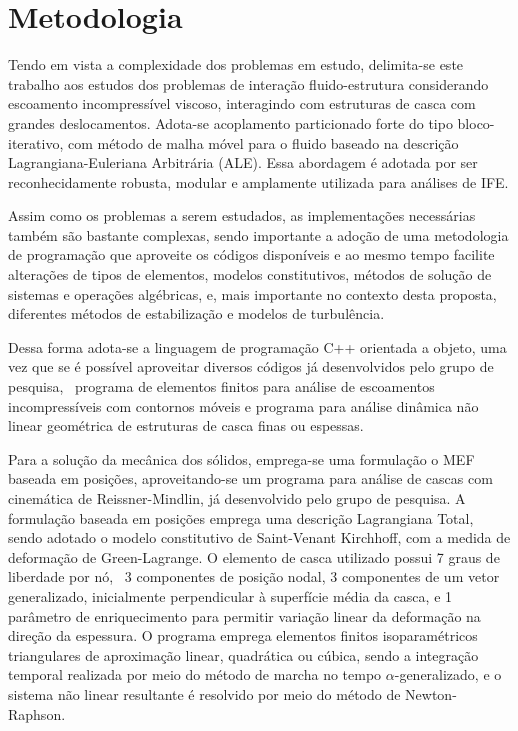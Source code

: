 \section{Metodologia} \label{MetodologiaCronograma}

Tendo em vista a complexidade dos problemas em estudo, delimita-se este trabalho aos estudos dos problemas de interação fluido-estrutura considerando escoamento incompressível viscoso, interagindo com estruturas de casca com grandes deslocamentos. Adota-se acoplamento particionado forte do tipo bloco-iterativo, com método de malha móvel para o fluido baseado na descrição Lagrangiana-Euleriana Arbitrária (ALE). Essa abordagem é adotada por ser reconhecidamente robusta, modular e amplamente utilizada para análises de IFE.

Assim como os problemas a serem estudados, as implementações necessárias também são bastante complexas, sendo importante a adoção de uma metodologia de programação que aproveite os códigos disponíveis e ao mesmo tempo facilite alterações de tipos de elementos, modelos constitutivos, métodos de solução de sistemas e operações algébricas, e, mais importante no contexto desta proposta, diferentes métodos de estabilização e modelos de turbulência.

Dessa forma adota-se a linguagem de programação C++ orientada a objeto, uma vez que se é possível aproveitar diversos códigos já desenvolvidos pelo grupo de pesquisa, \ie\ programa de elementos finitos para análise de escoamentos incompressíveis com contornos móveis e programa para análise dinâmica não linear geométrica de estruturas de casca finas ou espessas.

Para a solução da mecânica dos sólidos, emprega-se uma formulação o MEF baseada em posições, aproveitando-se um programa para análise de cascas com cinemática de Reissner-Mindlin, já desenvolvido pelo grupo de pesquisa. A formulação baseada em posições emprega uma descrição Lagrangiana Total, sendo adotado o modelo constitutivo de Saint-Venant Kirchhoff, com a medida de deformação de Green-Lagrange. O elemento de casca utilizado possui 7 graus de liberdade por nó, \ie\ 3 componentes de posição nodal, 3 componentes de um vetor generalizado, inicialmente perpendicular à superfície média da casca, e 1 parâmetro de enriquecimento para permitir variação linear da deformação na direção da espessura. O programa emprega elementos finitos isoparamétricos triangulares de aproximação linear, quadrática ou cúbica, sendo a integração temporal realizada por meio do método de marcha no tempo $\alpha$-generalizado, e o sistema não linear resultante é resolvido por meio do método de Newton-Raphson.%

